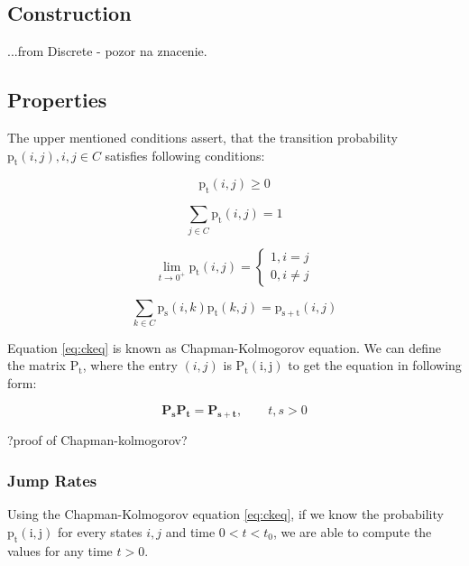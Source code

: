 \documentclass[thesis=M,english]{FITthesis}[2012/10/20]
\newcommand{\matr}[1]{\mathbf{#1}}
\begin{document}
\subsection{Construction} 
...from Discrete - pozor na znacenie.

\subsection{Properties} 

The upper mentioned conditions assert, that the transition probability $\mathrm{p_t}(i,j), i,j \in C$ satisfies following conditions:%


\begin{equation}
\mathrm{p_t}(i,j) \geq 0
\end{equation}

\begin{equation}
\sum_{j \in C} \mathrm{p_t}(i,j) = 1
\end{equation}

\begin{equation}\label{eq:l0}  
\lim_{t \to 0^+} \mathrm{p_t}(i,j)= 
\begin{cases}
1, i = j\\
0, i \neq j
\end{cases}
\end{equation}

\begin{equation}\label{eq:ckeq}
\sum_{k \in C}\mathrm{p_s}(i,k)\mathrm{p_t}(k,j) = \mathrm{p_{s+t}}(i,j)     
\end{equation}

Equation \eqref{eq:ckeq} is known as Chapman-Kolmogorov equation. 
We can define the matrix $\mathrm{P_t}$, where the entry $(i,j)$ is $\mathrm{P_t(i,j)}$ to get the equation in following form:

\begin{equation}\label{eq:ckm}
\matr{P_s} \matr{P_t} = \matr{P_{s+t}},   \qquad t,s > 0  
\end{equation}

?proof of Chapman-kolmogorov?


\subsubsection{ Jump Rates }

Using the Chapman-Kolmogorov equation \eqref{eq:ckeq}, if we know the probability $\mathrm{p_t(i,j)}$ for every states $i,j$ and time $0 < t < t_0$, we are able to compute the values for any time $t > 0$. 
\end{document}
